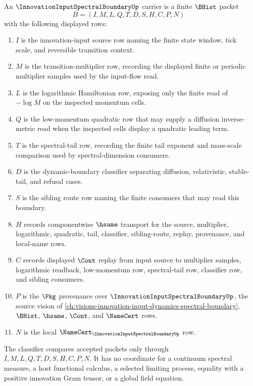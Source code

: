 \begin{definition}
\label{def:innovation-input-spectral-boundary-carrier}
An $\InnovationInputSpectralBoundaryUp$ carrier is a finite $\BHist$ packet
$$
B=(I,M,L,Q,T,D,S,H,C,P,N)
$$
with the following displayed rows:
\begin{enumerate}
\item $I$ is the innovation-input source row naming the finite state window, tick scale, and reversible transition context.
\item $M$ is the transition-multiplier row, recording the displayed finite or periodic multiplier samples used by the input-flow read.
\item $L$ is the logarithmic Hamiltonian row, exposing only the finite read of $-\log M$ on the inspected momentum cells.
\item $Q$ is the low-momentum quadratic row that may supply a diffusion inverse-metric read when the inspected cells display a quadratic leading term.
\item $T$ is the spectral-tail row, recording the finite tail exponent and mass-scale comparison used by spectral-dimension consumers.
\item $D$ is the dynamic-boundary classifier separating diffusion, relativistic, stable-tail, and refusal cases.
\item $S$ is the sibling route row naming the finite consumers that may read this boundary.
\item $H$ records componentwise $\hsame$ transport for the source, multiplier, logarithmic, quadratic, tail, classifier, sibling-route, replay, provenance, and local-name rows.
\item $C$ records displayed $\Cont$ replay from input source to multiplier samples, logarithmic readback, low-momentum row, spectral-tail row, classifier row, and sibling consumers.
\item $P$ is the $\Pkg$ provenance over $\InnovationInputSpectralBoundaryUp$, the source vision of \autoref{ch:visions-innovation-input-dynamics-spectral-boundary}, $\BHist$, $\hsame$, $\Cont$, and $\NameCert$ rows.
\item $N$ is the local $\NameCert_{\InnovationInputSpectralBoundaryUp}$ row.
\end{enumerate}
The classifier compares accepted packets only through $I,M,L,Q,T,D,S,H,C,P,N$. It has no coordinate for a continuum spectral measure, a host functional calculus, a selected limiting process, equality with a positive innovation Gram tensor, or a global field equation.
\end{definition}

